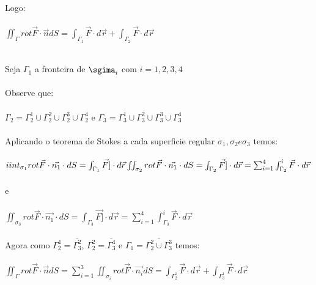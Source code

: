 \documentclass[11pt,a4paper]{article}
\begin{document}
\begin{enumerate}
{                        Logo:\\\\
                        $\iint_{\Gamma} rot\vec{F}\cdot\vec{n}dS = \int_{\Gamma_1} \vec{F} \cdot d\vec{r} + \int_{\Gamma_2} \vec{F} \cdot d\vec{r}$\\\\
                        \item Seja $\Gamma_1$ a fronteira de $\sgima_i$ com $i = 1,2,3,4$\\\\
                        Observe que: \\\\
                        $\Gamma_2 = \Gamma_{2}^{1} \cup \Gamma_{2}^{2} \cup \Gamma_{2}^{3} \cup \Gamma_{2}^{4}$ e $\Gamma_{3} = \Gamma_{3}^{1}\cup \Gamma_{3}^{2} \cup \Gamma_{3}^{3} \cup \Gamma_{3}^{4}$\\\\
                        Aplicando o teorema de Stokes a cada superficie regular $\sigma_1 , \sigma_2  e \sigma_3$ temos:\\\\
                        $\\iint_{\sigma_1} rot \vec{F} \cdot \vec{n_1} \cdot dS = \int_{\Gamma_1} \vec{F]}\cdot d\vec{r}\\\\
                        \iint_{\sigma_2} rot \vec{F} \cdot \vec{n_1} \cdot dS = \int_{\Gamma_2} \vec{F]}\cdot d\vec{r} = \sum_{i=1}^{4} \int_{\Gamma_{2}}^{i} \vec{F}\cdot d\vec{r}$\\\\
                        e\\\\
                        $\iint_{\sigma_3} rot \vec{F} \cdot \vec{n_1} \cdot dS = \int_{\Gamma_3} \vec{F]}\cdot d\vec{r} = \sum_{i=1}^{4} \int_{\Gamma_{3}}^{i} \vec{F}\cdot d\vec{r}$\\\\
                        Agora como $\Gamma_{2}^{4} = \bar{\Gamma_{3}^{2}}$, $\Gamma_{2}^{2} = \bar{\Gamma_{3}^{4}}$ e $\Gamma_{1} = \bar{\Gamma_{2}^{2} \cup \Gamma_{3}^{3} }$ temos: \\\\
                        $\iint_{\Gamma} rot\vec{F}\cdot\vec{n}dS = \sum_{i=1}^{3} \iint_{\sigma_i} rot\vec{F}\cdot\vec{n_i}dS = \int_{\Gamma_{2}^{1}} \vec{F} \cdot d\vec{r} + \int_{\Gamma_{3}^{1}} \vec{F} \cdot d\vec{r}$\\\\
}
\end{enumerate}
\end{document}
